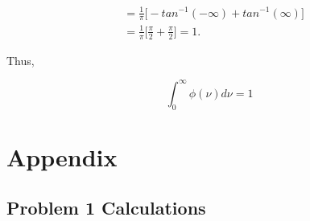 \documentclass[11pt]{article}
\begin{document}
\begin{align*}
&= \frac{1}{\pi} \Bigg[-tan^{-1}(-\infty) + tan^{-1}(\infty) \Bigg] \\
&= \frac{1}{\pi} \Bigg[\frac{\pi}{2} + \frac{\pi}{2}\Bigg] = 1.
\end{align*}

Thus,

$$
\int_{0}^{\infty} \phi(\nu) d\nu = 1
$$

\clearpage

\section*{Appendix}

\subsection*{Problem 1 Calculations}


\clearpage


\end{document}

